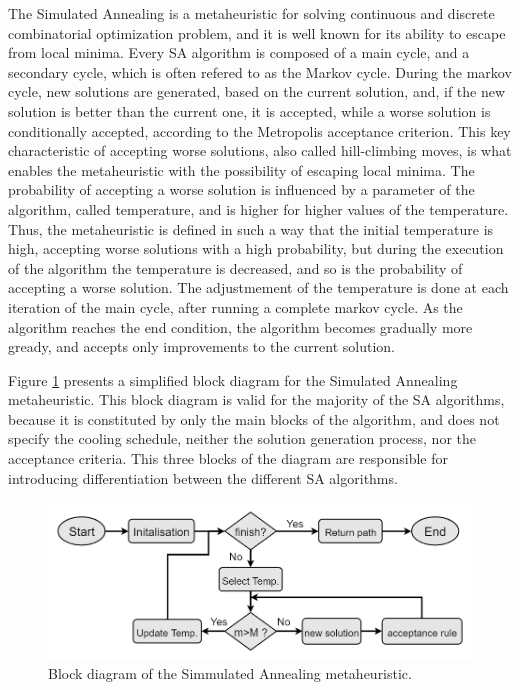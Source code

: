 The Simulated Annealing is a metaheuristic for solving continuous and discrete combinatorial optimization problem,
and it is well known for its ability to escape from local minima. 
Every SA algorithm is composed of a main cycle, and a secondary cycle, which is often refered to as 
the Markov cycle. During the markov cycle, new solutions are generated, based on the current solution,
and, if the new solution is better than the current one, it is accepted, while a worse solution 
is conditionally accepted, according to the Metropolis acceptance criterion.
This key characteristic of accepting worse solutions, also called hill-climbing moves,
is what enables the metaheuristic with the possibility of escaping local minima.
The probability of accepting a worse solution is influenced by a parameter of the algorithm,
called temperature, and is higher for higher values of the temperature.
Thus, the metaheuristic is defined in such a way that the initial temperature is high,
accepting worse solutions with a high probability, but during the execution of the algorithm
the temperature is decreased, and so is the probability of accepting a worse solution.
The adjustmement of the temperature is done at each iteration of the main cycle,
after running a complete markov cycle.
As the algorithm reaches the end condition, the algorithm becomes gradually more gready,
and accepts only improvements to the current solution.

Figure \ref{fig:LBSA} presents a simplified block diagram for the Simulated Annealing metaheuristic.
This block diagram is valid for the majority of the SA algorithms, because it is constituted by only the main blocks 
of the algorithm, and does not specify the cooling schedule, neither the solution generation process,
nor the acceptance criteria. This three blocks of the diagram are responsible for introducing differentiation 
between the different SA algorithms.

\begin{figure}[htpb]
  \centering
  \includegraphics[width=\textwidth]{./Figures/system_implementation/LBSA.png}
  \caption{Block diagram of the Simmulated Annealing metaheuristic.}
  \label{fig:LBSA}  
\end{figure}

